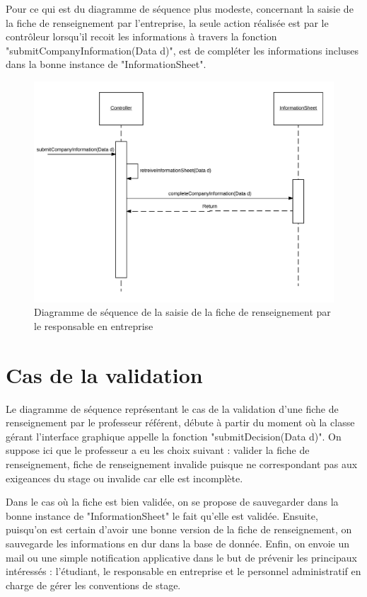 \documentclass{scrreprt}
\begin{document}
\newpage
	Pour ce qui est du diagramme de séquence plus modeste, concernant la saisie de la fiche de renseignement par l'entreprise, 
la seule action réalisée est par le contrôleur lorsqu'il recoit les informations à travers la fonction "submitCompanyInformation(Data d)",
est de compléter les informations incluses dans la bonne instance de "InformationSheet".

\begin{figure}[h]
\centering
\includegraphics[width=15cm]{images/submitCompanySeqDiagram.png}
\caption{Diagramme de séquence de la saisie de la fiche de renseignement par le responsable en entreprise}
\end{figure}

\newpage
\section{Cas de la validation}

	Le diagramme de séquence représentant le cas de la validation d'une fiche de renseignement par le professeur référent, débute 
à partir du moment où la classe gérant l'interface graphique appelle la fonction "submitDecision(Data d)". On suppose ici que 
le professeur a eu les choix suivant : valider la fiche de renseignement, fiche de renseignement invalide puisque ne correspondant 
pas aux exigeances du stage ou invalide car elle est incomplète. 

	Dans le cas où la fiche est bien validée, on se propose de sauvegarder dans la bonne instance de "InformationSheet" le fait qu'elle est 
validée. Ensuite, puisqu'on est certain d'avoir une bonne version de la fiche de renseignement, on sauvegarde les informations en dur 
dans la base de donnée. Enfin, on envoie un mail ou une simple notification applicative dans le but de prévenir les principaux intéressés :
l'étudiant, le responsable en entreprise et le personnel administratif en charge de gérer les conventions de stage.
\end{document}
